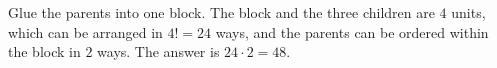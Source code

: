 Glue the parents into one block. The block and the three children are $4$ units, which can be arranged in $4!=24$ ways, and the parents can be ordered within the block in $2$ ways. The answer is $24\cdot2=\boxed{48}$.
